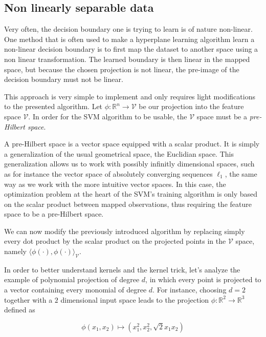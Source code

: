 \subsection{Non linearly separable data}

Very often, the decision boundary one is trying to learn is of nature non-linear. One method that is often used to make a hyperplane learning algorithm learn a non-linear decision boundary is to first map the dataset to another space using a non linear transformation. The learned boundary is then linear in the mapped space, but because the chosen projection is not linear, the pre-image of the decision boundary must not be linear.

This approach is very simple to implement and only requires light modifications to the presented algorithm. Let $\phi : \mathbb{R}^n \rightarrow \mathcal{V}$ be our projection into the feature space $\mathcal{V}$. In order for the SVM algorithm to be usable, the $\mathcal{V}$ space must be a \textit{pre-Hilbert space}.

A pre-Hilbert space is a vector space equipped with a scalar product. It is simply a generalization of the usual geometrical space, the Euclidian space. This generalization allows us to work with possibly infinitly dimensional spaces, such as for instance the vector space of absolutely converging sequences $\ell_1$, the same way as we work with the more intuitive vector spaces. In this case, the optimization problem at the heart of the SVM's training algorithm is only based on the scalar product between mapped observations, thus requiring the feature space to be a pre-Hilbert space. 

We can now modify the previously introduced algorithm by replacing simply every dot product by the scalar product on the projected points in the $\mathcal{V}$ space, namely $\langle \phi(\cdot), \phi(\cdot)\rangle _{\mathcal{V}}$.

In order to better understand kernels and the kernel trick, let's analyze the example of polynomial projection of degree $d$, in which every point is projected to a vector containing every monomial of degree $d$. For instance, choosing $d = 2$ together with a $2$ dimensional input space leads to the projection $\phi : \mathbb{R}^2 \rightarrow \mathbb{R}^3$ defined as

\begin{equation*}
    \phi(x_1, x_2) \mapsto (x_1^2, x_2^2, \sqrt{2}x_1x_2)
\end{equation*}


